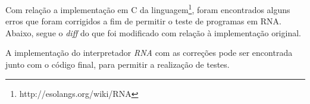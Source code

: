 Com relação a implementação em C da linguagem\footnote{http://esolangs.org/wiki/RNA}, foram encontrados alguns erros que foram corrigidos a fim de permitir o teste de programas em RNA. Abaixo, segue o \emph{diff} do que foi modificado com relação à implementação original.



A implementação do interpretador \emph{RNA} com as correções pode ser encontrada junto com o código final, para permitir a realização de testes.
